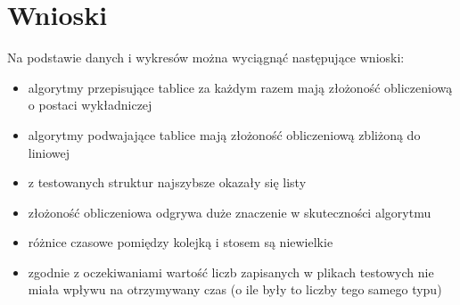 \documentclass[12pt,a4paper,titlepage]{article}
\begin{document}
\section{Wnioski}
Na podstawie danych i wykresów można wyciągnąć następujące wnioski:
\begin{itemize}
\item algorytmy przepisujące tablice za każdym razem mają złożoność obliczeniową o postaci wykładniczej
\item algorytmy podwajające tablice mają złożoność obliczeniową zbliżoną do liniowej
\item z testowanych struktur najszybsze okazały się listy 
\item złożoność obliczeniowa odgrywa duże znaczenie w skuteczności algorytmu
\item różnice czasowe pomiędzy kolejką i stosem są niewielkie
\item zgodnie z oczekiwaniami wartość liczb zapisanych w plikach testowych nie miała wpływu na otrzymywany czas (o ile były to liczby tego samego typu)
\end{itemize}
\end{document}
